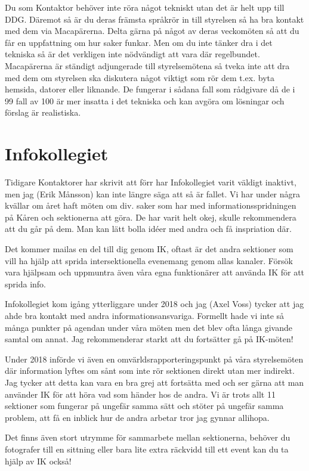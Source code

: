 \documentclass[10pt]{article}
\begin{document}
Du som Kontaktor behöver inte röra något tekniskt utan det är helt upp till DDG. Däremot så är du deras främsta språkrör in till styrelsen så ha bra kontakt med dem via Macapärerna. Delta gärna på något av deras veckomöten så att du får en uppfattning om hur saker funkar. Men om du inte tänker dra i det tekniska så är det verkligen inte nödvändigt att vara där regelbundet. Macapärerna är ständigt adjungerade till styrelsemötena så tveka inte att dra med dem om styrelsen ska diskutera något viktigt som rör dem t.ex. byta hemsida, datorer eller liknande. De fungerar i sådana fall som rådgivare då de i 99 fall av 100 är mer insatta i det tekniska och kan avgöra om lösningar och förslag är realistiska.
\newpage
\section{Infokollegiet}
Tidigare Kontaktorer har skrivit att förr har Infokollegiet varit väldigt inaktivt, men jag (Erik Månsson) kan inte längre säga att så är fallet. Vi har under några kvällar om året haft möten om div. saker som har med informationsspridningen på Kåren och sektionerna att göra. De har varit helt okej, skulle rekommendera att du går på dem. Man kan lätt bolla idéer med andra och få inspriation där.

Det kommer mailas en del till dig genom IK, oftast är det andra sektioner som vill ha hjälp att sprida intersektionella evenemang genom allas kanaler. Försök vara hjälpsam och uppmuntra även våra egna funktionärer att använda IK för att sprida info.

Infokollegiet kom igång ytterliggare under 2018 och jag (Axel Voss) tycker att jag ahde bra kontakt med andra informationsansvariga. Formellt hade vi inte så många punkter på agendan under våra möten men det blev ofta långa givande samtal om annat. Jag rekommenderar starkt att du fortsätter gå på IK-möten!

Under 2018 införde vi även en omvärldsrapporteringspunkt på våra styrelsemöten där information lyftes om sånt som inte rör sektionen direkt utan mer indirekt. Jag tycker att detta kan vara en bra grej att fortsätta med och ser gärna att man använder IK för att höra vad som händer hos de andra. Vi är trots allt 11 sektioner som fungerar på ungefär samma sätt och stöter på ungefär samma problem, att få en inblick hur de andra arbetar tror jag gynnar allihopa. 

Det finns även stort utrymme för sammarbete mellan sektionerna, behöver du fotografer till en sittning eller bara lite extra räckvidd till ett event kan du ta hjälp av IK också!
\end{document}
